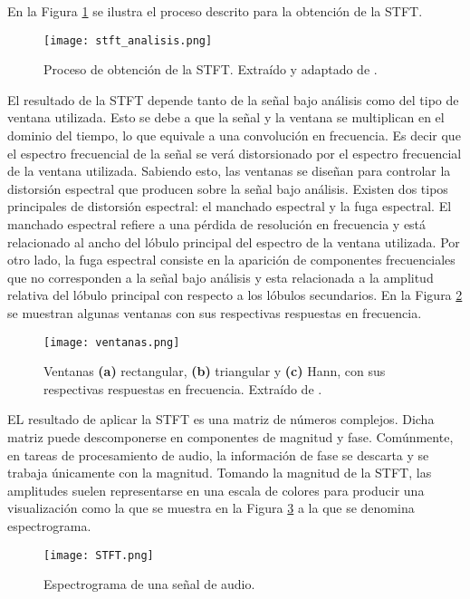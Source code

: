En la Figura \ref{fig:stft_analisis} se ilustra el proceso descrito para la obtención de la STFT.

\begin{figure}[H]
  \centering{}
  \texttt{[image: stft\_analisis.png]}
  \caption{Proceso de obtención de la STFT. Extraído y adaptado de \cite{matlab}.}
  \label{fig:stft_analisis}
\end{figure}

El resultado de la STFT depende tanto de la señal bajo análisis como del tipo de ventana utilizada. Esto se debe a que la señal y la ventana se multiplican en el dominio del tiempo, lo que equivale a una convolución en frecuencia. Es decir que el espectro frecuencial de la señal se verá distorsionado por el espectro frecuencial de la ventana utilizada. Sabiendo esto, las ventanas se diseñan para controlar la distorsión espectral que producen sobre la señal bajo análisis. Existen dos tipos principales de distorsión espectral: el manchado espectral y la fuga espectral. El manchado espectral refiere a una pérdida de resolución en frecuencia y está relacionado al ancho del lóbulo principal del espectro de la ventana utilizada. Por otro lado, la fuga espectral consiste en la aparición de componentes frecuenciales que no corresponden a la señal bajo análisis y esta relacionada a la amplitud relativa del lóbulo principal con respecto a los lóbulos secundarios. En la Figura \ref{fig:ventanas} se muestran algunas ventanas con sus respectivas respuestas en frecuencia.

\begin{figure}[H]
  \centering{}
  \texttt{[image: ventanas.png]}
  \caption{Ventanas \textbf{(a)} rectangular, \textbf{(b)} triangular y \textbf{(c)} Hann, con sus respectivas respuestas en frecuencia. Extraído de \cite{valerio}.}
  \label{fig:ventanas}
\end{figure}

EL resultado de aplicar la STFT es una matriz de números complejos. Dicha matriz puede descomponerse en componentes de magnitud y fase. Comúnmente, en tareas de procesamiento de audio, la información de fase se descarta y se trabaja únicamente con la magnitud. Tomando la magnitud de la STFT, las amplitudes suelen representarse en una escala de colores para producir una visualización como la que se muestra en la Figura \ref{fig:STFT} a la que se denomina espectrograma.

 \begin{figure}[H]
  \centering{}
  \texttt{[image: STFT.png]}
  \caption{Espectrograma de una señal de audio.}
  \label{fig:STFT}
\end{figure}

